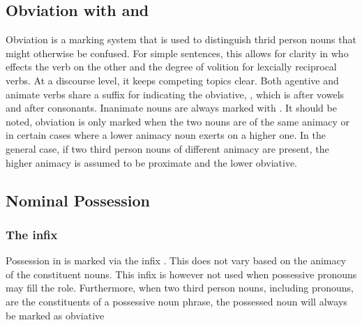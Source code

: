   \vertspace

  \subsection{Obviation with \suffixtext{\agtconsobv} and \suffixtext{\inanobv}}
  Obviation is a marking system that is used to distinguish thrid person nouns that might otherwise be confused.  For simple sentences, this allows for clarity in who effects the verb on the other and the degree of volition for lexcially reciprocal verbs. At a discourse level, it keeps competing topics clear. Both agentive and animate verbs share a suffix for indicating the obviative, \suffixtext{\agtobv}, which is \suffixtext{\agtvowelobv} after vowels and \suffixtext{\agtconsobv} after consonants. Inanimate nouns are always marked with \suffixtext{\inanobv}.
  It should be noted, obviation is only marked when the two nouns are of the same animacy or in certain cases where a lower animacy noun exerts on a higher one. In the general case, if two third person nouns of different animacy are present, the higher animacy is assumed to be proximate and the lower obviative.

  \subsection{Nominal Possession}

    \subsubsection{The \infixtext{\possessive} infix}
    Possession in \langname is marked via the infix \infixtext{\possessive}. This does not vary based on the animacy of the constituent nouns. This infix is however not used when possessive pronouns may fill the role. Furthermore, when two third person nouns, including pronouns, are the constituents of a possessive noun phrase, the possessed noun will always be marked as obviative


